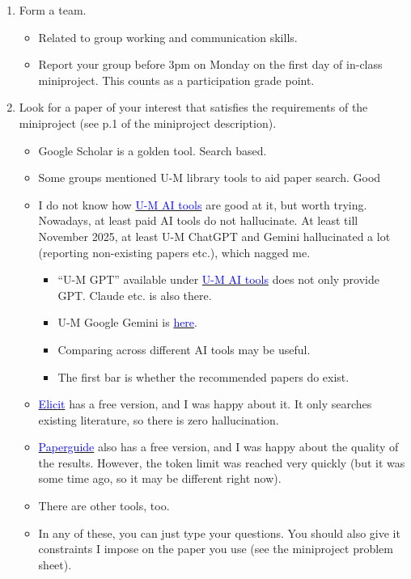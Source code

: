 \documentclass[20pt]{extarticle}
\newcommand{\hrefc}[2]{\href{#1}{\textcolor{blue}{#2}}}
\begin{document}
\begin{enumerate}
\item Form a team.
	\begin{itemize}
	\item Related to group working and communication skills.
	\item Report your group before 3pm on Monday on the first day of in-class miniproject. This counts as a participation grade point.
	\end{itemize}
\item Look for a paper of your interest that satisfies the requirements of the miniproject (see p.1 of the miniproject description).
	\begin{itemize}
	\item Google Scholar is a golden tool. Search based.
	\item Some groups mentioned U-M library tools to aid paper search. Good
	\item I do not know how \hrefc{https://its.umich.edu/computing/ai}{U-M AI tools} are good at it, but worth trying. Nowadays, at least paid AI tools do not hallucinate. At least till November 2025, at least U-M ChatGPT and Gemini hallucinated a lot (reporting non-existing papers etc.), which nagged me.
		\begin{itemize}
		\item ``U-M GPT'' available under \hrefc{https://its.umich.edu/computing/ai}{U-M AI tools} does not only provide GPT. Claude etc. is also there.
		\item U-M Google Gemini is \hrefc{https://its.umich.edu/computing/ai/notebook-lm-gemini}{here}.
		\item Comparing across different AI tools may be useful.
		\item The first bar is whether the recommended papers do exist.
		\end{itemize}
	\item \hrefc{https://elicit.com/}{Elicit} has a free version, and I was happy about it. It only searches existing literature, so there is zero hallucination.
	\item \hrefc{https://paperguide.ai/}{Paperguide} also has a free version, and I was happy about the quality of the results. However, the token limit was reached very quickly (but it was some time ago, so it may be different right now).
	\item There are other tools, too.
	\item In any of these, you can just type your questions. You should also give it constraints I impose on the paper you use (see the miniproject problem sheet).

\end{itemize}
\end{enumerate}
\end{document}
